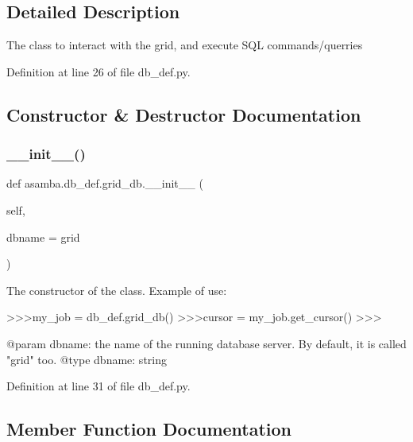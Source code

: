 \subsection{Detailed Description}
\begin{DoxyVerb}The class to interact with the grid, and execute SQL commands/querries
\end{DoxyVerb}
 

Definition at line 26 of file db\+\_\+def.\+py.



\subsection{Constructor \& Destructor Documentation}
\mbox{\label{classasamba_1_1db__def_1_1grid__db_a12b1aeeefe8ddf8d57ccf1dcdcd005c9}} 
\subsubsection{\texorpdfstring{\+\_\+\+\_\+init\+\_\+\+\_\+()}{\_\_init\_\_()}}
{\footnotesize\ttfamily def asamba.\+db\+\_\+def.\+grid\+\_\+db.\+\_\+\+\_\+init\+\_\+\+\_\+ (\begin{DoxyParamCaption}\item[{}]{self,  }\item[{}]{dbname = {\ttfamily \textquotesingle{}grid\textquotesingle{}} }\end{DoxyParamCaption})}

\begin{DoxyVerb}The constructor of the class. Example of use:

>>>my_job = db_def.grid_db()
>>>cursor = my_job.get_cursor()
>>>

@param dbname: the name of the running database server. By default, it is called "grid" too.
@type dbname: string
\end{DoxyVerb}
 

Definition at line 31 of file db\+\_\+def.\+py.



\subsection{Member Function Documentation}
\mbox{\label{classasamba_1_1db__def_1_1grid__db_ab9bebf7f7c59d58113210aa514e20000}} 
